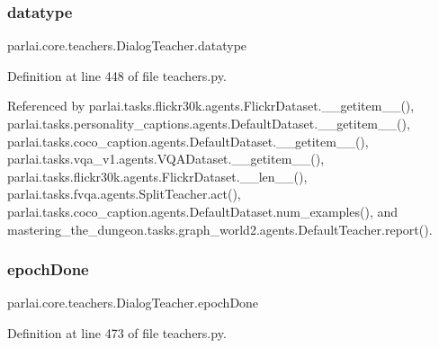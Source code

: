 \mbox{\label{classparlai_1_1core_1_1teachers_1_1DialogTeacher_a4bd247f78e23331700e150991d0afdba}} 
\subsubsection{\texorpdfstring{datatype}{datatype}}
{\footnotesize\ttfamily parlai.\+core.\+teachers.\+Dialog\+Teacher.\+datatype}



Definition at line 448 of file teachers.\+py.



Referenced by parlai.\+tasks.\+flickr30k.\+agents.\+Flickr\+Dataset.\+\_\+\+\_\+getitem\+\_\+\+\_\+(), parlai.\+tasks.\+personality\+\_\+captions.\+agents.\+Default\+Dataset.\+\_\+\+\_\+getitem\+\_\+\+\_\+(), parlai.\+tasks.\+coco\+\_\+caption.\+agents.\+Default\+Dataset.\+\_\+\+\_\+getitem\+\_\+\+\_\+(), parlai.\+tasks.\+vqa\+\_\+v1.\+agents.\+V\+Q\+A\+Dataset.\+\_\+\+\_\+getitem\+\_\+\+\_\+(), parlai.\+tasks.\+flickr30k.\+agents.\+Flickr\+Dataset.\+\_\+\+\_\+len\+\_\+\+\_\+(), parlai.\+tasks.\+fvqa.\+agents.\+Split\+Teacher.\+act(), parlai.\+tasks.\+coco\+\_\+caption.\+agents.\+Default\+Dataset.\+num\+\_\+examples(), and mastering\+\_\+the\+\_\+dungeon.\+tasks.\+graph\+\_\+world2.\+agents.\+Default\+Teacher.\+report().

\mbox{\label{classparlai_1_1core_1_1teachers_1_1DialogTeacher_a9e2cd457217253ef6d3aa0b23418739b}} 
\subsubsection{\texorpdfstring{epoch\+Done}{epochDone}}
{\footnotesize\ttfamily parlai.\+core.\+teachers.\+Dialog\+Teacher.\+epoch\+Done}



Definition at line 473 of file teachers.\+py.

